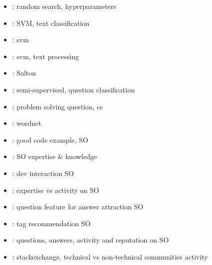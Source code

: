 \begin{itemize}
	\item \cite{BergstraBengio2012}: random search, hyperparameters
	\item \cite{TongKoller2002}: SVM, text classification
	\item \cite{HearstDumaisOsmanEtAl1998}: svm
	\item \cite{Kaestner2013}: svm, text processing
	\item \cite{Dubin2004}: Salton	
	\item \cite{NguyenNguyenShimazu2008}: semi-supervised, question classification
	\item \cite{RagonisShilo2013}: problem solving question, cs
	\item \cite{Miller1995}: wordnet	
	\item \cite{NasehiSillitoMaurerEtAl2012}: good code example, SO
	\item \cite{HanrahanConvertinoNelson2012}: SO expertise \& knowledge
	\item \cite{WangLoJiang2013}: dev interaction SO
	\item \cite{YangTaoBozzonEtAl2014}: expertise vs activity on SO
	\item \cite{ChengSchiffWu2013}: question feature for answer attraction SO
	\item \cite{ShortWongZeng2014}: tag recommendation SO
	\item \cite{PosnettWarburgDevanbuEtAl2012}: questions, answers, activity and reputation on SO
	\item \cite{AhmedYangJohri2015}: stackexchange, technical vs non-technical communities activity
\end{itemize}

